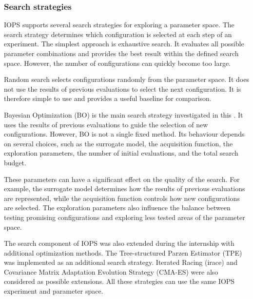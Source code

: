 \subsubsection{Search strategies}

IOPS supports several search strategies for exploring a parameter space.
The search strategy determines which configuration is selected at each
step of an experiment. The simplest approach is exhaustive search. It evaluates all possible
parameter combinations and provides the best result within the defined
search space. However, the number of configurations can quickly become
too large. 

Random search selects configurations randomly from the parameter space.
It does not use the results of previous evaluations to select the next
configuration. It is therefore simple to use and provides a useful
baseline for comparison. 

Bayesian Optimization (BO) is the main search strategy investigated in
this . It uses the results of previous evaluations to guide the
selection of new configurations. However, BO is not a single fixed
method. Its behaviour depends on several choices, such as the surrogate
model, the acquisition function, the exploration parameters, the number
of initial evaluations, and the total search budget.

These parameters can have a significant effect on the quality of the
search. For example, the surrogate model determines how the results of
previous evaluations are represented, while the acquisition function
controls how new configurations are selected. The exploration parameters
also influence the balance between testing promising configurations and
exploring less tested areas of the parameter space.


The search component of IOPS was also extended during the internship with
additional optimization methods. The Tree-structured Parzen Estimator
(TPE) was implemented as an additional search strategy. Iterated Racing
(irace) and Covariance Matrix Adaptation Evolution Strategy (CMA-ES) were
also considered as possible extensions. All these strategies can use the same IOPS experiment and parameter
space. 

